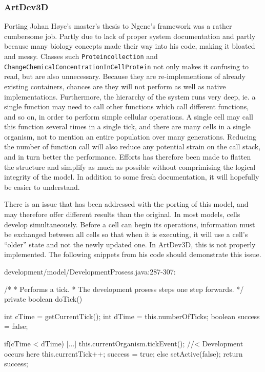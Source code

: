\subsubsection{ArtDev3D}
Porting Johan H{\o}ye's master's thesis\cite{hoye2006} to Ngene's framework was a rather cumbersome job. Partly due to lack of proper system documentation and partly because many biology concepts made their way into his code, making it bloated and messy. Classes such \texttt{Proteincollection} and \texttt{ChangeChemicalConcentrationInCellProtein} not only makes it confusing to read, but are also unnecessary. Because they are re-implementions of already existing containers, chances are they will not perform as well as native implementations. Furthermore, the hierarchy of the system runs very deep, ie. a single function may need to call other functions which call different functions, and so on, in order to perform simple cellular operations. A single cell may call this function several times in a single tick, and there are many cells in a single organism, not to mention an entire population over many generations. Reducing the number of function call will also reduce any potential strain on the call stack, and in turn better the performance. Efforts has therefore been made to flatten the structure and simplify as much as possible without comprimising the logical integrity of the model. In addition to some fresh documentation, it will hopefully be easier to understand.

There is an issue that has been addressed with the porting of this model, and may therefore offer different results than the original. In most models, cells develop simultaneously. Before a cell can begin its operations, information must be exchanged between all cells so that when it is executing, it will use a cell's ``older'' state and not the newly updated one. In ArtDev3D, this is not properly implemented. The following snippets from his code should demonstrate this issue.

\begin{verbatimtab}
development/model/DevelopmentProsess.java:287-307:

/*
 * Performs a tick.
 * The development prosess steps one step forwards.
 */
private boolean doTick() {
	int cTime = getCurrentTick();
	int dTime = this.numberOfTicks;
	boolean success = false;

	if(cTime < dTime) {
		[...]
		this.currentOrganism.tickEvent(); //< Development occurs here
		this.currentTick++;
		success = true;
	} else {
		setActive(false);
	}
	return success;
}
\end{verbatimtab}

